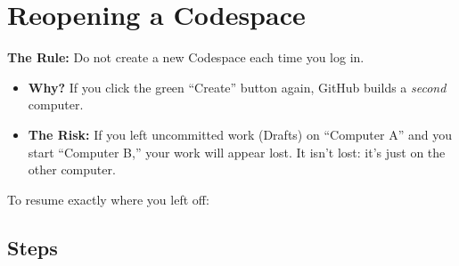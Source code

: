 \documentclass[
  letterpaper,
  DIV=11,
  numbers=noendperiod,
  oneside]{scrreprt}
\providecommand{\tightlist}{%
  \setlength{\itemsep}{0pt}\setlength{\parskip}{0pt}}
\begin{document}
\chapter{Reopening a Codespace}\label{reopening-a-codespace}

\textbf{The Rule:} Do not create a new Codespace each time you log in.

\begin{itemize}
\tightlist
\item
  \textbf{Why?} If you click the green ``Create'' button again, GitHub
  builds a \emph{second} computer.
\item
  \textbf{The Risk:} If you left uncommitted work (Drafts) on ``Computer
  A'' and you start ``Computer B,'' your work will appear lost. It isn't
  lost: it's just on the other computer.
\end{itemize}

To resume exactly where you left off:

\section{Steps}\label{steps-1}
\end{document}
